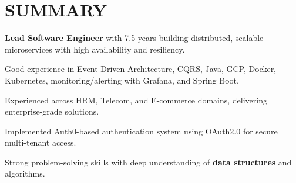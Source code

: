 \begin{minipage}[t]{0.66\textwidth}

\section{SUMMARY}
\vspace{\topsep}
\begin{tightemize}
\item \textbf{Lead Software Engineer} with 7.5 years building distributed, scalable microservices with high availability and resiliency.
\item Good experience in Event-Driven Architecture, CQRS, Java, GCP, Docker, Kubernetes, monitoring/alerting with Grafana, and Spring Boot.
\item Experienced across HRM, Telecom, and E-commerce domains, delivering enterprise-grade solutions.
\item Implemented Auth0-based authentication system using OAuth2.0 for secure multi-tenant access.
\item Strong problem-solving skills with deep understanding of \textbf{data structures} and algorithms.
\end{tightemize}



\end{minipage}
